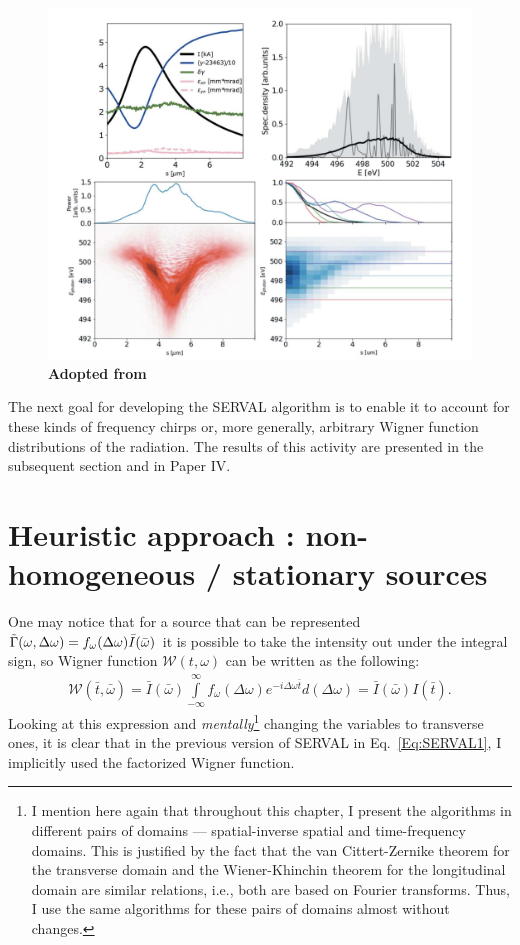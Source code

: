     \begin{figure}[h!]
    	\centering
        \includegraphics[width=0.75
        \linewidth]{content/images/4_FEL_Theory/ROSA_sim.png}
        \captionsetup{justification=centering}
        \caption{\textbf{Adopted from \cite{serkez_wigner_2021}}}
        \label{Fig:ROSA_sim}
    \end{figure} 
    The next goal for developing the SERVAL algorithm is to enable it to account for these kinds of frequency chirps or, more generally, arbitrary Wigner function distributions of the radiation. The results of this activity are presented in the subsequent section and in Paper IV.

\setcounter{mycounter}{3}
\section{Heuristic approach : non- homogeneous / stationary sources}

    One may notice that for a source that can be represented $\Tilde{\Gamma}(\omega, \Delta \omega) = f_{\omega}(\Delta \omega)\bar{I}(\bar{\omega})$ it is possible to take the intensity out under the integral sign, so Wigner function $\mathcal{W}(t, \omega)$ can be written as the following:
    \begin{align}
        \mathcal{W}(\bar{t}, \bar{\omega}) = \bar{I}(\bar{\omega}) \int \limits_{-\infty}^{\infty} f_{\omega}(\Delta \omega) e^{-i\Delta \omega \bar{t}}d(\Delta \omega) = \bar{I}(\bar{\omega}) I(\bar{t}).
    \end{align}
    Looking at this expression and \textit{mentally}\footnote{I mention here again that throughout this chapter, I present the algorithms in different pairs of domains — spatial-inverse spatial and time-frequency domains. This is justified by the fact that the van Cittert-Zernike theorem for the transverse domain and the Wiener-Khinchin theorem for the longitudinal domain are similar relations, i.e., both are based on Fourier transforms. Thus, I use the same algorithms for these pairs of domains almost without changes.} changing the variables to transverse ones, it is clear that in the previous version of SERVAL in Eq.~\ref{Eq:SERVAL1}, I implicitly used the factorized Wigner function.
    
